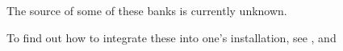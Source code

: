    The source of some of these banks is currently unknown.

   To find out how to integrate these into one's installation, see
   , and

